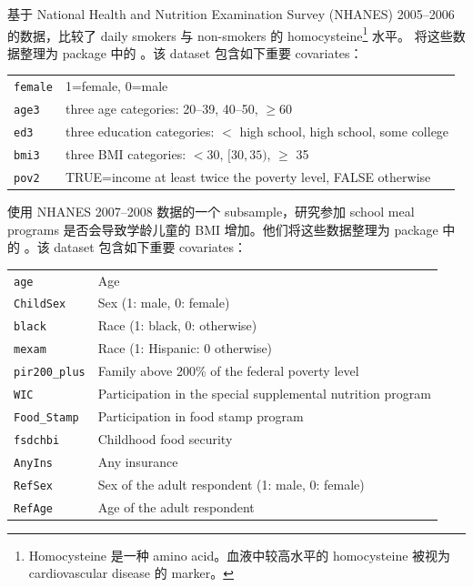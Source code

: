  
  \begin{example}
 \label{eg::nhanes2005-2006}
 \citet{bazzano2003relationship} 基于 National Health and Nutrition Examination Survey (NHANES) 2005--2006 的数据，比较了 daily smokers 与 non-smokers 的 homocysteine\footnote{Homocysteine 是一种 amino acid。血液中较高水平的 homocysteine 被视为 cardiovascular disease 的 marker。} 水平。\citet{rosenbaum2018sensitivity} 将这些数据整理为 package  中的 。该 dataset 包含如下重要 covariates：
 
\begin{tabular}{ll}
\hline 
\texttt{female} &
1=female, 0=male
\\
\texttt{age3} &
three age categories: 20--39, 40--50, $\geq $60
\\
\texttt{ed3} &
three education categories: $<$ high school, high school, some college
\\
\texttt{bmi3}&
three BMI categories: $<$30, $[30,35)$, $\geq $ 35
\\
\texttt{pov2}&
TRUE=income at least twice the poverty level, FALSE otherwise\\
\hline 
\end{tabular} 

 \end{example}
 
 
 
 
   \begin{example} 
 \label{eg::chan-bmi-ATE}
 \citet{chan2016globally} 使用 NHANES 2007--2008 数据的一个 subsample，研究参加 school meal programs 是否会导致学龄儿童的 BMI 增加。他们将这些数据整理为 package  中的 。该 dataset 包含如下重要 covariates：
 
\begin{tabular}{ll}
\hline 
\texttt{age}&
Age  
\\
\texttt{ChildSex}&
Sex (1: male, 0: female)
\\
\texttt{black}&
Race (1: black, 0: otherwise) 
\\
\texttt{mexam}&
Race (1: Hispanic: 0 otherwise)
\\
\texttt{pir200\_plus}&
Family above 200\% of the federal poverty level  \\
\texttt{WIC}&
Participation in the special supplemental nutrition program \\
\texttt{Food\_Stamp}&
Participation in food stamp program   \\
\texttt{fsdchbi}&
Childhood food security  \\
\texttt{AnyIns}&
Any insurance \\
\texttt{RefSex}&
Sex of the adult respondent (1: male, 0: female) \\
\texttt{RefAge}&
Age of the adult respondent\\
\hline 
\end{tabular} 

 \end{example}
 
